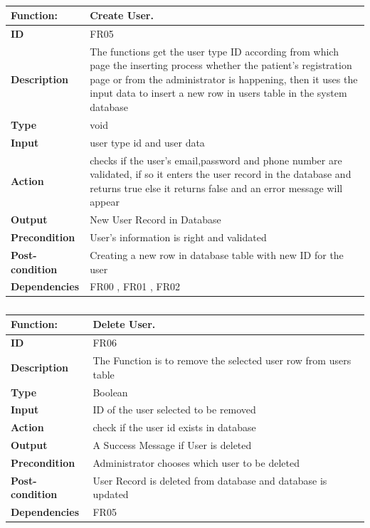 \documentclass[]{article}
\begin{document}
\FloatBarrier
\begin{table}[h]
\caption{}
\label{tab:my-table}
\begin{tabular}{|p{}|p{}|}
\hline
\textbf{Function:} & Create User.
\\ \hline
\textbf{ID}  & FR05          
\\ \hline
\textbf{Description}    &  The functions get the user type ID according from which page the inserting process whether the patient's registration page or from the administrator is happening, then it
uses the input data to insert a new row in users table in
the system database                                                              \\ \hline
\textbf{Type}    & void     
\\ \hline
\textbf{Input}  & user type id and user data
\\ \hline
\textbf{Action} &  checks if the user's email,password and phone number are validated, if so it enters the user record in the database and returns true else it returns false and an error message will appear 
\\ \hline
\textbf{Output} & New User Record in Database
\\ \hline
\textbf{Precondition}  & User's information is right and validated     
\\ \hline
\textbf{Post-condition} & Creating a new row in database table with new ID for the user
\\ \hline
\textbf{Dependencies} & FR00 , FR01 , FR02  
\\ \hline
\end{tabular}
\end{table}

\FloatBarrier
\begin{table}[h]
\caption{}
\label{tab:my-table}
\begin{tabular}{|p{}|p{}|}
\hline
\textbf{Function:} & Delete User.
\\ \hline
\textbf{ID}        &FR06            
\\ \hline
\textbf{Description} & The Function is to remove the selected user row from users table                                                         \\ \hline
\textbf{Type}     & Boolean       
\\ \hline
\textbf{Input}   & ID of the user selected to be removed 
\\ \hline
\textbf{Action}  & check if the user id exists in database
\\ \hline
\textbf{Output}  & A Success Message if User is deleted 
\\ \hline
\textbf{Precondition}  & Administrator chooses which user to be deleted  
\\ \hline
\textbf{Post-condition} & User Record is deleted from database and database is updated 
\\ \hline
\textbf{Dependencies}  &FR05 
\\ \hline
\end{tabular}
\end{table}
\end{document}
